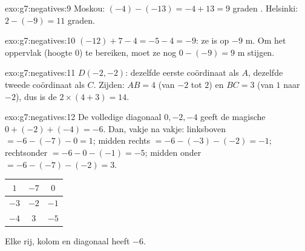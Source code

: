 \begin{solution}{exo:g7:negatives:9}
Moskou: $(-4) - (-13) = -4 + 13 = 9$ graden . Helsinki:
$2 - (-9) = 11$ graden.
\end{solution}

\begin{solution}{exo:g7:negatives:10}
$(-12) + 7 - 4 = -5 - 4 = -9$: ze is op $-9$ m. Om het oppervlak (hoogte $0$) te
bereiken, moet ze nog $0 - (-9) = 9$ m stijgen.
\end{solution}

\begin{solution}{exo:g7:negatives:11}
$D(-2, -2)$: dezelfde eerste coördinaat als $A$, dezelfde tweede coördinaat als
$C$. Zijden: $AB = 4$ (van $-2$ tot $2$) en $BC = 3$ (van $1$ naar $-2$), dus is
de  $2 \times (4 + 3) = 14$.
\end{solution}

\begin{solution}{exo:g7:negatives:12}
De volledige diagonaal $0, -2, -4$ geeft de magische 
$0 + (-2) + (-4) = -6$. Dan, vakje na vakje: linksboven
$= -6 - (-7) - 0 = 1$; midden rechts $= -6 - (-3) - (-2) = -1$; rechtsonder
$= -6 - 0 - (-1) = -5$; midden onder $= -6 - (-7) - (-2) = 3$.
\begin{center}
\renewcommand{\arraystretch}{1.4}
\begin{tabular}{|c|c|c|}
\hline
$1$ & $-7$ & $0$ \\
\hline
$-3$ & $-2$ & $-1$ \\
\hline
$-4$ & $3$ & $-5$ \\
\hline
\end{tabular}
\end{center}
Elke rij, kolom en diagonaal heeft  $-6$.
\end{solution}

